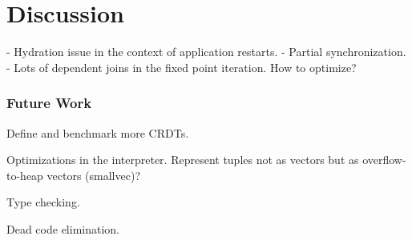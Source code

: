 
\chapter{Discussion}\label{ch:discussion}

- Hydration issue in the context of application restarts.
- Partial synchronization.
- Lots of dependent joins in the fixed point iteration. How to optimize?

\subsection{Future Work}

Define and benchmark more CRDTs.

Optimizations in the interpreter. Represent tuples not as vectors but
as overflow-to-heap vectors (smallvec)?

Type checking.

Dead code elimination.
